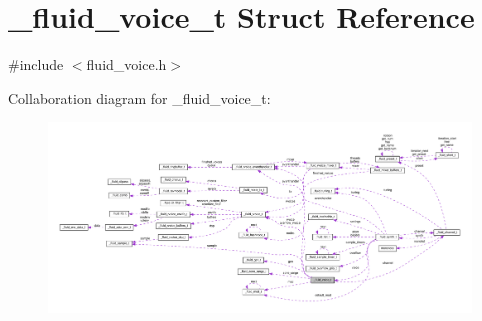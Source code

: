 \hypertarget{struct__fluid__voice__t}{}\section{\+\_\+fluid\+\_\+voice\+\_\+t Struct Reference}
\label{struct__fluid__voice__t}


{\ttfamily \#include $<$fluid\+\_\+voice.\+h$>$}



Collaboration diagram for \+\_\+fluid\+\_\+voice\+\_\+t\+:
\nopagebreak
\begin{figure}[H]
\begin{center}
\leavevmode
\includegraphics[width=350pt]{struct__fluid__voice__t__coll__graph}
\end{center}
\end{figure}
